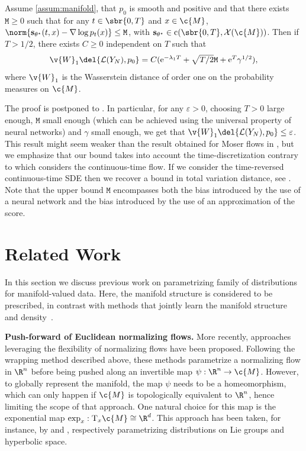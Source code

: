 \begin{theorem}
	\label{thm:weak_qualitative}
	Assume \cref{assum:manifold}, that $p_0$ is smooth and positive and that there exists $\mathtt{M} \geq 0$ such that for any $t \in \sbr{0,T}$ and $x \in \c{M}$, $\norm{\mathbf{s}_{\theta^{\star}}(t,x) - \nabla \log p_{t}(x)} \leq \mathtt{M}$, with $\mathbf{s}_{\theta^\star} \in \mathrm{c}(\sbr{0,T}, \mathcal{X}(\c{M}))$.
	Then if $T > 1/2$, there exists $C \geq 0$ independent on $T$ such that \begin{equation} \textstyle{\v{W}_1\del{\mathcal{L}(Y_N), p_0} = C ( \mathrm{e}^{-\lambda_1 T} + \sqrt{T/2} \mathtt{M} + \mathrm{e}^T \gamma^{1/2}) , } \end{equation} where $\v{W}_1$ is the Wasserstein distance of order one on the probability measures on $\c{M}$.
\end{theorem}

The proof is postponed to .
In particular, for any $\varepsilon > 0$, choosing $T > 0$ large enough, $\mathtt{M}$ small enough (which can be achieved using the universal property of neural networks) and $\gamma$ small enough, we get that $\v{W}_1\del{\mathcal{L}(Y_N), p_0} \leq \varepsilon$.
This result might seem weaker than the result obtained for Moser flows in \textcite[Theorem 3]{rozen2021moser}, but we emphasize that our bound takes into account the time-discretization contrary to \textcite{rozen2021moser} which considers the continuous-time flow.
If we consider the time-reversed continuous-time SDE then we recover a bound in total variation distance, see .
Note that the upper bound $\mathtt{M}$ encompasses both the bias introduced by the use of a neural network and the bias introduced by the use of an approximation of the score.

\section{Related Work}
\label{sec:related-works}

In this section we discuss previous work on parametrizing family of distributions for manifold-valued data.
Here, the manifold structure is considered to be prescribed, in contrast with methods that jointly learn the manifold structure and density~\parencite[e.g.][]{brehmer2020flows,caterini2021Rectangular}.

\textbf{Push-forward of Euclidean normalizing flows.}
More recently, approaches leveraging the flexibility of normalizing flows \parencite{papamakarios2019normalizing} have been proposed.
Following the wrapping method described above, these methods parametrize a normalizing flow in $\R^n$ before being pushed along an invertible map $\psi: \R^n \rightarrow \c{M}$.
However, to globally represent the manifold, the map $\psi$ needs to be a homeomorphism, which can only happen if $\c{M}$ is topologically equivalent to $\R^n$, hence limiting the scope of that approach.
One natural choice for this map is the exponential map $\exp_x: \mathrm{T}_x \c{M} \cong \R^d$.
This approach has been taken, for instance, by \textcite{falorsi2019reparameterizing} and \textcite{bose2020latent}, respectively parametrizing distributions on Lie groups and hyperbolic space.

